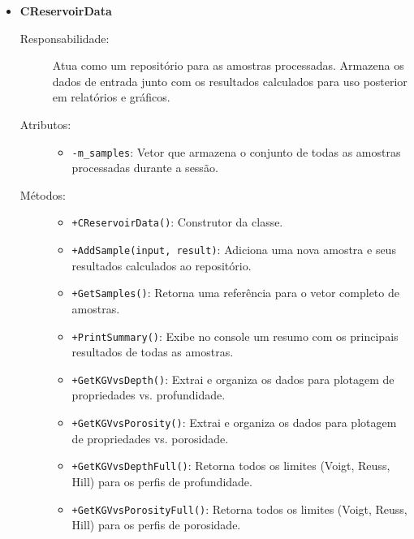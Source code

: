 \begin{itemize}
\begin{description}
        \item[Métodos:]
        \begin{itemize}
            \item \texttt{+CElasticCalculator(db)}: Construtor que recebe uma referência ao banco de dados de minerais.
            \item \texttt{+Calculate(input)}: Orquestra o cálculo para uma amostra, invocando os métodos de Voigt e Reuss e retornando os resultados.
            \item \texttt{-CalcVoigt(minerals, bulk)}: Implementa a média de Voigt para o módulo de compressibilidade ou de cisalhamento.
            \item \texttt{-CalcReuss(minerals, bulk)}: Implementa a média de Reuss para o módulo de compressibilidade ou de cisalhamento.
        \end{itemize}
    \end{description}

    \item \textbf{CReservoirData}
    \begin{description}
        \item[Responsabilidade:] Atua como um repositório para as amostras processadas. Armazena os dados de entrada junto com os resultados calculados para uso posterior em relatórios e gráficos.
        
        \item[Atributos:]
        \begin{itemize}
            \item \texttt{-m\_samples}: Vetor que armazena o conjunto de todas as amostras processadas durante a sessão.
        \end{itemize}
        
        \item[Métodos:]
        \begin{itemize}
            \item \texttt{+CReservoirData()}: Construtor da classe.
            \item \texttt{+AddSample(input, result)}: Adiciona uma nova amostra e seus resultados calculados ao repositório.
            \item \texttt{+GetSamples()}: Retorna uma referência para o vetor completo de amostras.
            \item \texttt{+PrintSummary()}: Exibe no console um resumo com os principais resultados de todas as amostras.
            \item \texttt{+GetKGVvsDepth()}: Extrai e organiza os dados para plotagem de propriedades vs. profundidade.
            \item \texttt{+GetKGVvsPorosity()}: Extrai e organiza os dados para plotagem de propriedades vs. porosidade.
            \item \texttt{+GetKGVvsDepthFull()}: Retorna todos os limites (Voigt, Reuss, Hill) para os perfis de profundidade.
            \item \texttt{+GetKGVvsPorosityFull()}: Retorna todos os limites (Voigt, Reuss, Hill) para os perfis de porosidade.
        \end{itemize}
    \end{description}


\end{itemize}
